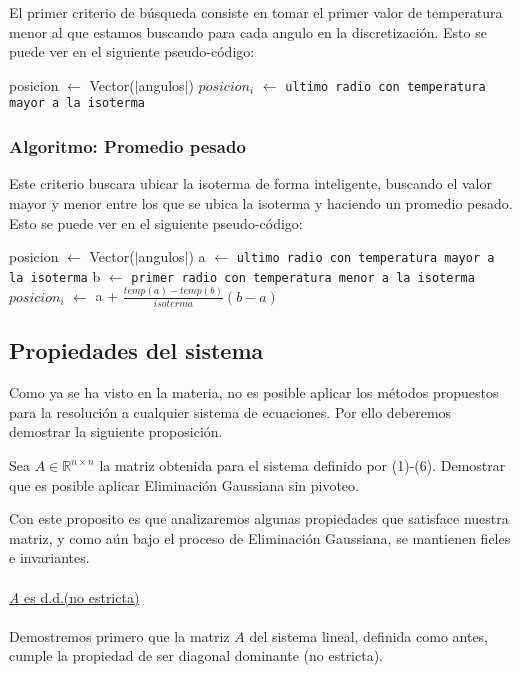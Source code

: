 El primer criterio de búsqueda consiste en tomar el primer valor de temperatura menor al que estamos buscando para cada angulo en la discretización. Esto se puede ver en el siguiente pseudo-código:

\begin{algorithmic}
\State posicion $\gets$ Vector($\vert$angulos$\vert$)
    \State $posicion_i$ $\gets$ \texttt{ultimo radio con temperatura mayor a la isoterma}
\EndFor
{}
\EndProcedure
\end{algorithmic}

\subsubsection{Algoritmo: Promedio pesado}

Este criterio buscara ubicar la isoterma de forma inteligente, buscando el valor mayor y menor entre los que se ubica la isoterma y haciendo un promedio pesado. Esto se puede ver en el siguiente pseudo-código:

\begin{algorithmic}
\State posicion $\gets$ Vector($\vert$angulos$\vert$)
    \State a $\gets$ \texttt{ultimo radio con temperatura mayor a la isoterma}
    \State b $\gets$ \texttt{primer radio con temperatura menor a la isoterma}
    \State $posicion_i$ $\gets$ a + $\frac{temp(a)-temp(b)}{isoterma}(b-a)$
\EndFor
{}
\EndProcedure
\end{algorithmic}

\subsection{Propiedades del sistema}
Como ya se ha visto en la materia, no es posible aplicar los métodos propuestos para la resoluci\'on a cualquier sistema de ecuaciones. Por ello deberemos demostrar la siguiente proposici\'on.

\begin{proposition}
Sea $A \in \mathbb{R}^{n \times n}$ la matriz obtenida para el sistema definido por (1)-(6). Demostrar que es posible
aplicar Eliminaci\'on Gaussiana sin pivoteo.
\end{proposition}

Con este proposito es que analizaremos algunas propiedades que satisface nuestra matriz, y como a\'un bajo el proceso de Eliminaci\'on Gaussiana, se mantienen fieles e invariantes.
\\
\\
\underline{\textit{A} es d.d.(no estricta)}
\\
\\
Demostremos primero que la matriz $A$ del sistema lineal, definida como antes, cumple la propiedad de ser diagonal dominante (no estricta).

